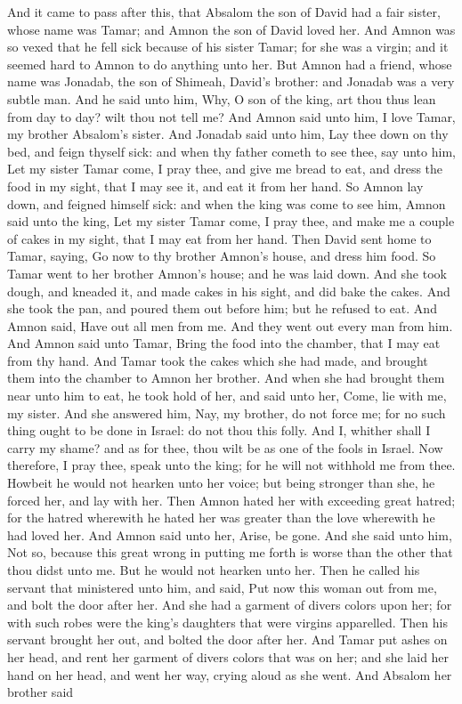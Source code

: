 And it came to pass after this, that Absalom the son of David had a fair sister, whose name was Tamar; and Amnon the son of David loved her. And Amnon was so vexed that he fell sick because of his sister Tamar; for she was a virgin; and it seemed hard to Amnon to do anything unto her. But Amnon had a friend, whose name was Jonadab, the son of Shimeah, David’s brother: and Jonadab was a very subtle man. And he said unto him, Why, O son of the king, art thou thus lean from day to day? wilt thou not tell me? And Amnon said unto him, I love Tamar, my brother Absalom’s sister. And Jonadab said unto him, Lay thee down on thy bed, and feign thyself sick: and when thy father cometh to see thee, say unto him, Let my sister Tamar come, I pray thee, and give me bread to eat, and dress the food in my sight, that I may see it, and eat it from her hand. So Amnon lay down, and feigned himself sick: and when the king was come to see him, Amnon said unto the king, Let my sister Tamar come, I pray thee, and make me a couple of cakes in my sight, that I may eat from her hand.  Then David sent home to Tamar, saying, Go now to thy brother Amnon’s house, and dress him food. So Tamar went to her brother Amnon’s house; and he was laid down. And she took dough, and kneaded it, and made cakes in his sight, and did bake the cakes. And she took the pan, and poured them out before him; but he refused to eat. And Amnon said, Have out all men from me. And they went out every man from him. And Amnon said unto Tamar, Bring the food into the chamber, that I may eat from thy hand. And Tamar took the cakes which she had made, and brought them into the chamber to Amnon her brother. And when she had brought them near unto him to eat, he took hold of her, and said unto her, Come, lie with me, my sister. And she answered him, Nay, my brother, do not force me; for no such thing ought to be done in Israel: do not thou this folly. And I, whither shall I carry my shame? and as for thee, thou wilt be as one of the fools in Israel. Now therefore, I pray thee, speak unto the king; for he will not withhold me from thee. Howbeit he would not hearken unto her voice; but being stronger than she, he forced her, and lay with her.  Then Amnon hated her with exceeding great hatred; for the hatred wherewith he hated her was greater than the love wherewith he had loved her. And Amnon said unto her, Arise, be gone. And she said unto him, Not so, because this great wrong in putting me forth is worse than the other that thou didst unto me. But he would not hearken unto her. Then he called his servant that ministered unto him, and said, Put now this woman out from me, and bolt the door after her. And she had a garment of divers colors upon her; for with such robes were the king’s daughters that were virgins apparelled. Then his servant brought her out, and bolted the door after her. And Tamar put ashes on her head, and rent her garment of divers colors that was on her; and she laid her hand on her head, and went her way, crying aloud as she went.  And Absalom her brother said 